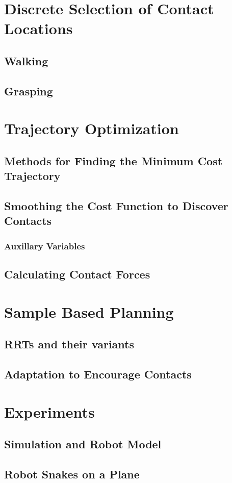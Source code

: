 \documentclass[../thesis.tex]{subfiles}
\begin{document}


\section{Discrete Selection of Contact Locations}
\subsection{Walking}
\subsection{Grasping}

\section{Trajectory Optimization}
\subsection{Methods for Finding the Minimum Cost Trajectory}
\subsection{Smoothing the Cost Function to Discover Contacts}
\subsubsection{Auxillary Variables}
\subsection{Calculating Contact Forces}


\section{Sample Based Planning}
\subsection{RRTs and their variants}
\subsection{Adaptation to Encourage Contacts}

\section{Experiments}
\subsection{Simulation and Robot Model}
\subsection{Robot Snakes on a Plane}
\end{document}
